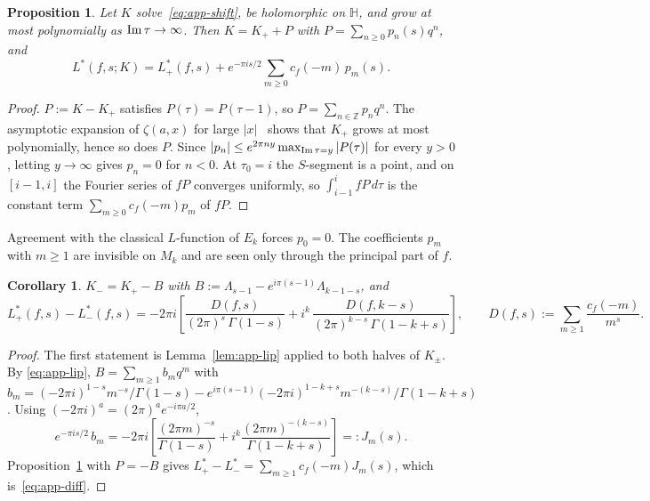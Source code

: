\documentclass[11pt]{article}
\newtheorem{proposition}[theorem]{Proposition}
\newtheorem{corollary}[theorem]{Corollary}
\newcommand{\HH}{\mathbb{H}}
\newcommand{\ZZ}{\mathbb{Z}}
\begin{document}
\begin{proposition}\label{prop:app-general}
Let $K$ solve~\eqref{eq:app-shift}, be holomorphic on $\HH$, and grow at most polynomially as
${\rm Im}\,\tau\to\infty$. Then $K=K_++P$ with $P=\sum_{n\ge0}p_n(s)q^n$, and
\begin{equation}\label{eq:app-Pshift}
L^*(f,s;K)=L^*_+(f,s)+e^{-\pi is/2}\sum_{m\ge0}c_f(-m)\,p_m(s).
\end{equation}
\end{proposition}

\begin{proof}
$P:=K-K_+$ satisfies $P(\tau)=P(\tau-1)$, so $P=\sum_{n\in\ZZ}p_nq^n$. The asymptotic expansion of
$\zeta(a,x)$ for large $|x|$~\cite[\S25.11]{DLMF} shows that $K_+$ grows at most polynomially, hence
so does $P$. Since $|p_n|\le e^{2\pi n y}\max_{{\rm Im}\,\tau=y}|P(\tau)|$ for every $y>0$, letting
$y\to\infty$ gives $p_n=0$ for $n<0$. At $\tau_0=i$ the $S$-segment is a point, and on
$[i-1,i]$ the Fourier series of $fP$ converges uniformly, so $\int_{i-1}^{i}fP\,d\tau$ is the constant
term $\sum_{m\ge0}c_f(-m)p_m$ of $fP$.
\end{proof}

Agreement with the classical $L$-function of $E_k$ forces $p_0=0$. The coefficients $p_m$ with
$m\ge1$ are invisible on $M_k$ and are seen only through the principal part of $f$.

\begin{corollary}\label{cor:app-kerneldiff}
$K_-=K_+-B$ with $B:=\Lambda_{s-1}-e^{i\pi(s-1)}\Lambda_{k-1-s}$, and
\begin{equation}\label{eq:app-diff}
L^*_+(f,s)-L^*_-(f,s)=-2\pi i\left[\frac{D(f,s)}{(2\pi)^{s}\,\Gamma(1-s)}
+i^k\,\frac{D(f,k-s)}{(2\pi)^{k-s}\,\Gamma(1-k+s)}\right],\qquad
D(f,s):=\sum_{m\ge1}\frac{c_f(-m)}{m^{s}}.
\end{equation}
\end{corollary}

\begin{proof}
The first statement is Lemma~\ref{lem:app-lip} applied to both halves of $K_\pm$. By
\eqref{eq:app-lip}, $B=\sum_{m\ge1}b_mq^m$ with
$b_m=(-2\pi i)^{1-s}m^{-s}/\Gamma(1-s)-e^{i\pi(s-1)}(-2\pi i)^{1-k+s}m^{-(k-s)}/\Gamma(1-k+s)$.
Using $(-2\pi i)^a=(2\pi)^ae^{-i\pi a/2}$,
\[
e^{-\pi is/2}\,b_m=-2\pi i\left[\frac{(2\pi m)^{-s}}{\Gamma(1-s)}+i^k\frac{(2\pi m)^{-(k-s)}}{\Gamma(1-k+s)}\right]=:J_m(s).
\]
Proposition~\ref{prop:app-general} with $P=-B$ gives $L^*_+-L^*_-=\sum_{m\ge1}c_f(-m)J_m(s)$,
which is~\eqref{eq:app-diff}.
\end{proof}
\end{document}
